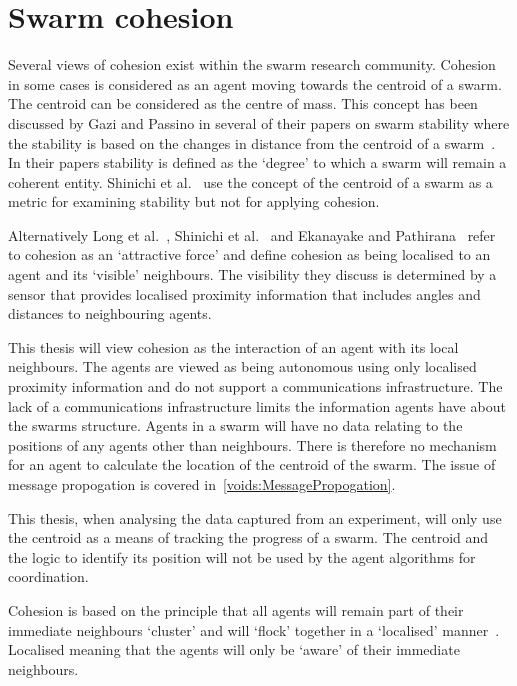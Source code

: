 \section{Swarm cohesion}\label{sec:Cohesion1}
Several views of cohesion exist within the swarm research community. Cohesion in some cases is considered as an agent moving towards the centroid of a swarm. The centroid can be considered as the centre of mass. This concept has been discussed by Gazi and Passino in several of their papers on swarm stability where the stability is based on the changes in distance from the centroid of a swarm~\cite{GP:11, GP:04}. In their papers stability is defined as the `degree' to which a swarm will remain a coherent entity. Shinichi et al.~\cite{AYSH:08} use the concept of the centroid of a swarm as a metric for examining stability but not for applying cohesion.

Alternatively Long et al.~\cite{QZYP:13}, Shinichi et al.~\cite{AYSH:08} and Ekanayake and Pathirana~\cite{EP:10} refer to cohesion as an `attractive force' and define cohesion as being localised to an agent and its `visible' neighbours. The visibility they discuss is determined by a sensor that provides localised proximity information that includes angles and distances to neighbouring agents.
 
This thesis will view cohesion as the interaction of an agent with its local neighbours. The agents are viewed as being autonomous using only localised proximity information and do not support a communications infrastructure. The lack of a communications infrastructure limits the information agents have about the swarms structure. Agents in a swarm will have no data relating to the positions of any agents other than neighbours. There is therefore no mechanism for an agent to calculate the location of the centroid of the swarm. The issue of message propogation is covered in~\autoref{voids:MessagePropogation}.

This thesis, when analysing the data captured from an experiment, will only use the centroid as a means of tracking the progress of a swarm. The centroid and the logic to identify its position will not be used by the agent algorithms for coordination. 

Cohesion is based on the principle that all agents will remain part of their immediate neighbours `cluster' and will `flock' together in a `localised' manner~\cite{VGHHDM:15, BAF:06, BAFVM:06, BFV:07, BM:09, HAY:08, HCS:09}. Localised meaning that the agents will only be `aware' of their immediate neighbours. 

